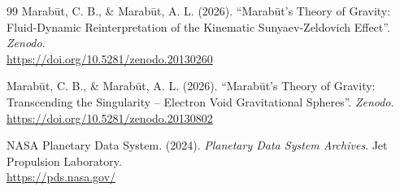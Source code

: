 \documentclass[11pt, a4paper]{article}
\begin{document}
\begin{thebibliography}{99}
  Marab\={u}t, C. B., \& Marab\={u}t, A. L. (2026). ``Marab\={u}t's Theory of Gravity: Fluid-Dynamic Reinterpretation of the Kinematic Sunyaev-Zeldovich Effect''. \textit{Zenodo}. \\ \url{https://doi.org/10.5281/zenodo.20130260}

  Marab\={u}t, C. B., \& Marab\={u}t, A. L. (2026). ``Marab\={u}t's Theory of Gravity: Transcending the Singularity -- Electron Void Gravitational Spheres''. \textit{Zenodo}. \\ \url{https://doi.org/10.5281/zenodo.20130802}

  NASA Planetary Data System. (2024). \textit{Planetary Data System Archives}. Jet Propulsion Laboratory. \\ \url{https://pds.nasa.gov/}

\end{thebibliography}
\end{document}
